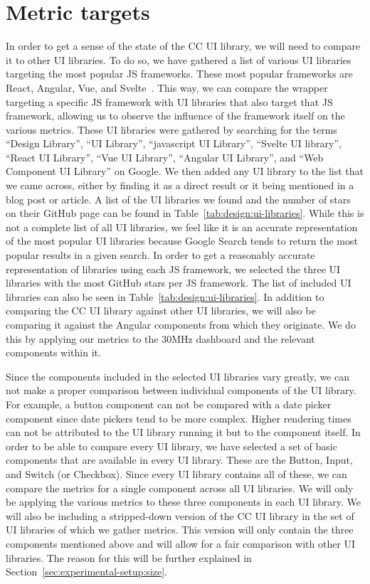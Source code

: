 \section{Metric targets}
In order to get a sense of the state of the CC UI library, we will need to compare it to other UI libraries. To do so, we have gathered a list of various UI libraries targeting the most popular JS frameworks. These most popular frameworks are React, Angular, Vue, and Svelte~. This way, we can compare the wrapper targeting a specific JS framework with UI libraries that also target that JS framework, allowing us to observe the influence of the framework itself on the various metrics. These UI libraries were gathered by searching for the terms ``Design Library'', ``UI Library'', ``javascript UI Library'', ``Svelte UI library'', ``React UI Library'', ``Vue UI Library'', ``Angular UI Library'', and ``Web Component UI Library'' on Google. We then added any UI library to the list that we came across, either by finding it as a direct result or it being mentioned in a blog post or article. A list of the UI libraries we found and the number of stars on their GitHub page can be found in Table~\ref{tab:design:ui-libraries}. While this is not a complete list of all UI libraries, we feel like it is an accurate representation of the most popular UI libraries because Google Search tends to return the most popular results in a given search. In order to get a reasonably accurate representation of libraries using each JS framework, we selected the three UI libraries with the most GitHub stars per JS framework. The list of included UI libraries can also be seen in Table~\ref{tab:design:ui-libraries}. In addition to comparing the CC UI library against other UI libraries, we will also be comparing it against the Angular components from which they originate. We do this by applying our metrics to the 30MHz dashboard and the relevant components within it.

Since the components included in the selected UI libraries vary greatly, we can not make a proper comparison between individual components of the UI library. For example, a button component can not be compared with a date picker component since date pickers tend to be more complex. Higher rendering times can not be attributed to the UI library running it but to the component itself. In order to be able to compare every UI library, we have selected a set of basic components that are available in every UI library. These are the Button, Input, and Switch (or Checkbox). Since every UI library contains all of these, we can compare the metrics for a single component across all UI libraries. We will only be applying the various metrics to these three components in each UI library. We will also be including a stripped-down version of the CC UI library in the set of UI libraries of which we gather metrics. This version will only contain the three components mentioned above and will allow for a fair comparison with other UI libraries. The reason for this will be further explained in Section~\ref{sec:experimental-setup:size}.

